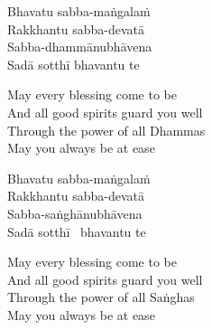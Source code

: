 \begin{pali-hang-continued}
  Bhavatu sabba-maṅgalaṁ\\
  Rakkhantu sabba-devatā\\
  Sabba-dhammānubhāvena\\
  Sadā sotthī bhavantu te
\end{pali-hang-continued}

\begin{english-verses}
  May every blessing come to be\\
  And all good spirits guard you well\\
  Through the power of all Dhammas\\
  May you always be at ease
\end{english-verses}

\begin{pali-hang-continued}
  Bhavatu sabba-maṅgalaṁ\\
  Rakkhantu sabba-devatā\\
  Sabba-saṅghānubhāvena\\
  Sadā sotthī \breathmark\ bhavantu te
\end{pali-hang-continued}

\begin{english-verses}
  May every blessing come to be\\
  And all good spirits guard you well\\
  Through the power of all Saṅghas\\
  May you always be at ease
\end{english-verses}

\suttaRef{[Trad]}

